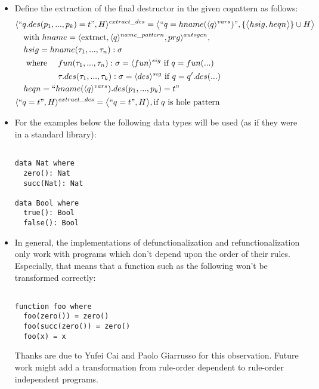 \documentclass[11pt]{article} %
\begin{document}
\begin{itemize}
\item Define the extraction of the final destructor in the given copattern as follows:
\begin{alignat*}{2}
& \langle `` q.des(p_1, ..., p_k) = t ", H \rangle^{extract\_des} = \big\langle `` q = hname(\langle q \rangle^{vars})  ", \{ \big\langle hsig, heqn \big\rangle \} \cup H \big\rangle \span\span \\
&\quad \textrm{with } hname = \langle \textrm{extract}, \langle q \rangle^{name\_pattern}, prg \rangle^{autogen}, \span\span \\
&\quad hsig = hname(\tau_1, ..., \tau_n): \sigma \span\span \\
&\quad \textrm{ where } && fun(\tau_1, ..., \tau_n): \sigma = \langle fun \rangle^{sig} \textrm{ if } q = fun(...)\\
&\quad && \tau.des(\tau_1, ..., \tau_k) : \sigma = \langle des \rangle^{sig} \textrm{ if } q = q'.des(...) \\
&\quad heqn = `` hname(\langle q \rangle^{vars}).des(p_1, ..., p_k) = t  " \span\span \\
& \langle `` q = t ", H \rangle^{extract\_des} = \big\langle `` q = t ", H \big\rangle, \textrm{if $q$ is hole pattern} \span\span
\end{alignat*}

\item For the examples below the following data types will be used (as if they were in a standard library):
\begin{lstlisting}

data Nat where
  zero(): Nat
  succ(Nat): Nat

data Bool where
  true(): Bool
  false(): Bool

\end{lstlisting}

\item In general, the implementations of defunctionalization and refunctionalization only work with programs which don't depend upon the order of their rules. Especially, that means that a function such as the following won't be transformed correctly:
\begin{lstlisting}

function foo where
  foo(zero()) = zero()
  foo(succ(zero()) = zero()
  foo(x) = x

\end{lstlisting}

Thanks are due to Yufei Cai and Paolo Giarrusso for this observation. Future work might add a transformation from rule-order dependent to rule-order independent programs.

\end{itemize}
\end{document}
